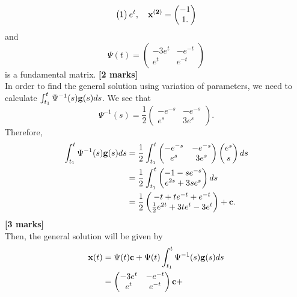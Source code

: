 \documentclass[11pt,a4paper]{article}
\begin{document}
\begin{enumerate}
$$\begin{pmatrix}
			1
		\end{pmatrix}e^t,\quad \vb{x^{(2)}} =
		\begin{pmatrix}
			-1\\
			1.
		\end{pmatrix}
		$$
		and
		$$
		\Psi(t) = 
		\begin{pmatrix}
			-3e^t & -e^{-t}\\
			e^t & e^{-t}
		\end{pmatrix}
		$$
		is a fundamental matrix.
		\hspace*{0pt}\hfill\textbf{[2 marks]}\\
		In order to find the general solution using variation of parameters, we need to calculate $\int^t_{t_1} \Psi^{-1}(s)\vb{g}(s)ds$. We see that
		$$
		\Psi^{-1}(s) = \frac{1}{2}
		\begin{pmatrix}
			-e^{-s} & -e^{-s}\\
			e^s & 3e^s
		\end{pmatrix}.
		$$
		Therefore,
		\begin{align*}
			\int^t_{t_1} \Psi^{-1}(s)\vb{g}(s)ds
			&= \frac{1}{2}\int^t_{t_1}
			\begin{pmatrix}
				-e^{-s} & -e^{-s}\\
				e^s & 3e^s
			\end{pmatrix}
			\begin{pmatrix}
				e^s\\
				s
			\end{pmatrix}ds\\
			&= \frac{1}{2}\int^t_{t_1}
			\begin{pmatrix}
				-1-se^{-s}\\
				e^{2s} + 3se^s
			\end{pmatrix}ds\\
			&= \frac{1}{2}
			\begin{pmatrix}
				-t+te^{-t}+e^{-t}\\
				\frac{1}{2}e^{2t} + 3te^t - 3e^t
			\end{pmatrix} + \vb{c}.
		\end{align*}
		\hfill\textbf{[3 marks]}\\
		Then, the general solution will be given by
		\begin{align*}
			\vb{x}(t)
			&= \Psi(t)\vb{c} + \Psi(t)\int^t_{t_1}\Psi^{-1}(s)\vb{g}(s)ds\\
			&= 
			\begin{pmatrix}
				-3e^t & -e^{-t}\\
				e^t & e^{-t}
			\end{pmatrix}\vb{c} +

\end{align*}
\end{enumerate}
\end{document}
